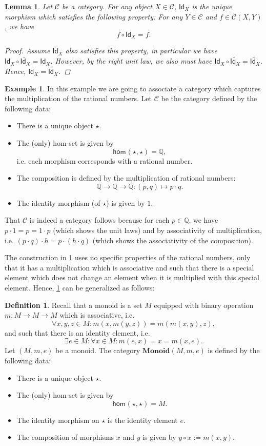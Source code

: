 \documentclass[a4paper,10pt]{scrartcl}
\theoremstyle{plain}
\newtheorem{lemma}[thm]{Lemma}
\theoremstyle{definition}
\newtheorem{dfn}[thm]{Definition}
\newtheorem{exa}[thm]{Example}
\newcommand{\cfont}[1]{\ensuremath{\mathsf{#1}}}
\newcommand{\Cat}[1]{\mathcal{#1}}
\newcommand{\CC}{\Cat{C}}
\newcommand{\Catb}[1]{\mathbf{#1}}
\newcommand{\MON}{\Catb{Monoid}}
\newcommand{\Hom}[3][]{\cfont{hom}_{#1}(#2,#3)}
\newcommand{\CHom}[3]{{#1}(#2,#3)}
\newcommand{\Id}[1][]{\cfont{Id}_{#1}}
\newcommand{\co}[2]{\ensuremath{#2 \circ #1}}
\begin{document}
\begin{lemma}\label{lemma:uniqueid} Let $\CC$ be a category. For any object $X\in\CC$, $\Id[X]$ is the unique morphism which satisfies the following property: For any $Y\in\CC$ and $f\in\CHom \CC X Y$, we have 
\[
\co{\Id[X]} f = f.
\]
\begin{proof}
Assume $\tilde{\Id[X]}$ also satisfies this property, in particular we have $\co {\tilde{\Id[X]}} {\Id[X]} = \Id[X]$. However, by the right unit law, we also must have $\co{\tilde{\Id[X]}}{\Id[X]} = \tilde{\Id[X]}$. Hence, $\Id[X] = \tilde{\Id[X]}$.
\end{proof}
\end{lemma}

\begin{exa}\label{exa:monoidofrationalnumbers} In this example we are going to associate a category which captures the multiplication of the rational numbers. Let $\CC$ be the category defined by the following data:
\begin{itemize}
\item There is a unique object $\star$.
\item The (only) hom-set is given by
\[
\Hom{\star}{\star} = \mathbb{Q},
\]
i.e. each morphism corresponds with a rational number.
\item The composition is defined by the multiplication of rational numbers:
\[
\mathbb{Q} \to\mathbb{Q}\to\mathbb{Q} : (p,q)\mapsto p\cdot q.
\]
\item The identity morphism (of $\star$) is given by $1$.
\end{itemize}
That $\CC$ is indeed a category follows because for each $p\in\mathbb{Q}$, we have $p\cdot 1 = p = 1\cdot p$ (which shows the unit laws) and by associativity of multiplication, i.e. $(p\cdot q)\cdot h = p\cdot (h \cdot q)$ (which shows the associativity of the composition).
\end{exa}
The construction in \cref{exa:monoidofrationalnumbers} uses no specific properties of the rational numbers, only that it has a multiplication which is associative and such that there is a special element which does not change an element when it is multiplied with this special element. Hence, \cref{exa:monoidofrationalnumbers} can be generalized as follows:
\begin{dfn}\label{monoidcategory}
Recall that a monoid is a set $M$ equipped with binary operation $m : M \to M \to M$ which is associative, i.e. 
$$\forall x,y,z\in M: m(x,m(y,z)) = m(m(x,y),z),$$
and such that there is an identity element, i.e. 
\[
\exists e\in M: \forall x\in M: m(e,x)=x=m(x,e).
\]
Let $(M,m,e)$ be a monoid. The category $\MON(M,m,e)$ is defined by the following data:
\begin{itemize}
\item There is a unique object $\star$.
\item The (only) hom-set is given by 
\[
\Hom{\star}{\star} = M.
\]
\item The identity morphism on $\star$ is the identity element $e$.
\item The composition of morphisms $x$ and $y$ is given by $\co{x}{y} := m(x,y)$.
\end{itemize}
\end{dfn}
\end{document}
